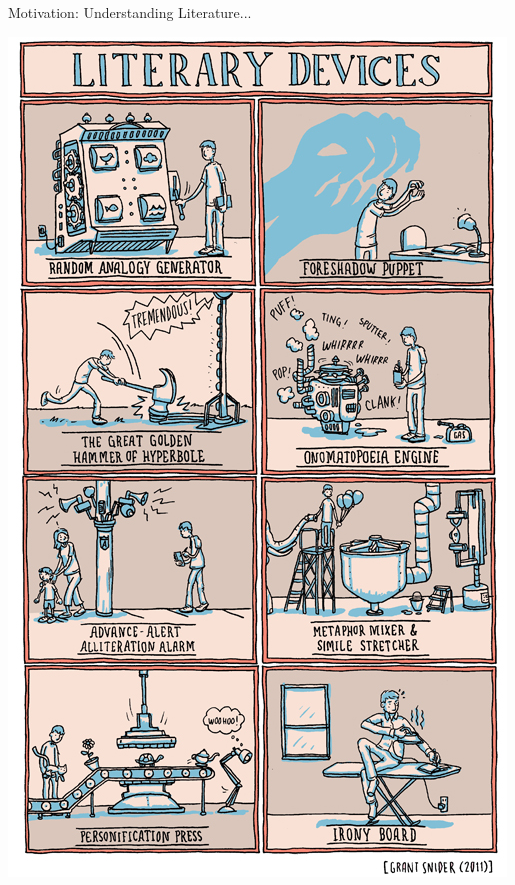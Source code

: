 \documentclass[xcolor=x11names]{beamer}
\begin{document}
\begin{frame}{Motivation: Understanding Literature...}
\begin{center}
  \includegraphics[height=0.8\textheight]{res/literary-devices.jpg}
\end{center}
\end{frame}
\end{document}
